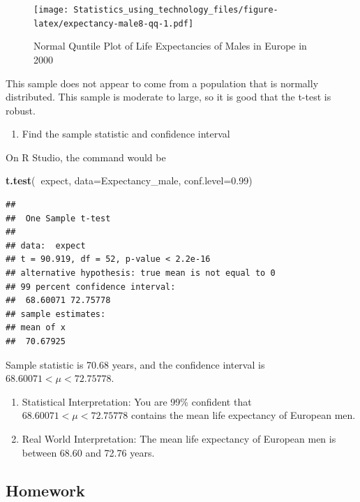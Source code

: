 \documentclass[]{book}
\newenvironment{Shaded}{\begin{snugshade}}{\end{snugshade}}
\newcommand{\DataTypeTok}[1]{\textcolor[rgb]{0.13,0.29,0.53}{#1}}
\newcommand{\FloatTok}[1]{\textcolor[rgb]{0.00,0.00,0.81}{#1}}
\newcommand{\KeywordTok}[1]{\textcolor[rgb]{0.13,0.29,0.53}{\textbf{#1}}}
\newcommand{\NormalTok}[1]{#1}
\newcommand{\OperatorTok}[1]{\textcolor[rgb]{0.81,0.36,0.00}{\textbf{#1}}}
\providecommand{\tightlist}{%
  \setlength{\itemsep}{0pt}\setlength{\parskip}{0pt}}
\begin{document}
\begin{figure}
\centering
\texttt{[image: Statistics\_using\_technology\_files/figure-latex/expectancy-male8-qq-1.pdf]}
\caption{\label{fig:expectancy-male8-qq}Normal Quntile Plot of Life Expectancies of Males in Europe in 2000}
\end{figure}

This sample does not appear to come from a population that is normally distributed. This sample is moderate to large, so it is good that the t-test is robust.

\begin{enumerate}
\def\labelenumi{\arabic{enumi}.}
\setcounter{enumi}{2}
\tightlist
\item
  Find the sample statistic and confidence interval
\end{enumerate}

On R Studio, the command would be

\begin{Shaded}
\begin{Highlighting}[]
\KeywordTok{t.test}\NormalTok{(}\OperatorTok{~}\NormalTok{expect, }\DataTypeTok{data=}\NormalTok{Expectancy_male, }\DataTypeTok{conf.level=}\FloatTok{0.99}\NormalTok{)}
\end{Highlighting}
\end{Shaded}

\begin{verbatim}
## 
##  One Sample t-test
## 
## data:  expect
## t = 90.919, df = 52, p-value < 2.2e-16
## alternative hypothesis: true mean is not equal to 0
## 99 percent confidence interval:
##  68.60071 72.75778
## sample estimates:
## mean of x 
##  70.67925
\end{verbatim}

Sample statistic is 70.68 years, and the confidence interval is \(68.60071<\mu<72.75778\).

\begin{enumerate}
\def\labelenumi{\arabic{enumi}.}
\setcounter{enumi}{3}
\item
  Statistical Interpretation: You are 99\% confident that \(68.60071<\mu<72.75778\) contains the mean life expectancy of European men.
\item
  Real World Interpretation: The mean life expectancy of European men is between 68.60 and 72.76 years.
\end{enumerate}

\hypertarget{homework-25}{%
\subsection{Homework}\label{homework-25}}
\end{document}
